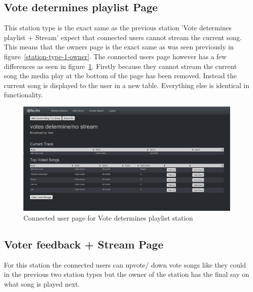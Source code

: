 \documentclass[a4paper, 12pt]{report}
\begin{document}
\subsection{Vote determines playlist Page}
This station type is the exact same as the previous station 'Vote determines playlist + Stream' expect that connected users cannot stream the current song. This means that the owners page is the exact same as was seen previously in figure~\ref{station-type-1-owner}. The connected users page however has a few differences as seen in figure~\ref{station-type-2-listener}. Firstly because they cannot stream the current song the media play at the bottom of the page has been removed. Instead the current song is displayed to the user in a new table. Everything else is identical in functionality.
\begin{figure}[H]
  \centering
    \includegraphics[width=1.0\textwidth]{screenshots/station-type-2-listener.png}
    \caption{Connected user page for Vote determines playlist station}
    \label{station-type-2-listener}
\end{figure}

\subsection{Voter feedback + Stream Page}
For this station the connected users can upvote/ down vote songs like they could in the previous two station types but the owner of the station has the final say on what song is played next.\\
\end{document}
